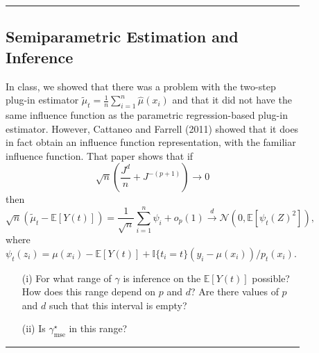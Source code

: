 \documentclass{article}
\newenvironment{colorparagraph}[1]{\par\color{#1}}{\par}
\begin{document}
\begin{figure}[H]
  \begin{colorparagraph}{questioncolor}
  \rule{\textwidth}{0.5pt}
  \label{q1g}
  \subsection{Semiparametric Estimation and Inference}

  In class, we showed that there was a problem with the two-step plug-in estimator \( \tilde{\mu}_t = \frac{1}{n} \sum_{i=1}^n \hat{\mu}(x_i) \) and that it did not have the same influence function as the parametric regression-based plug-in estimator. However, Cattaneo and Farrell (2011) showed that it does in fact obtain an influence function representation, with the familiar influence function. That paper shows that if
  \[
  \sqrt{n} \left( \frac{J^d}{n} + J^{-(p+1)} \right) \to 0
  \]
  then
  \[
  \sqrt{n} (\tilde{\mu}_t - \mathbb{E}[Y(t)]) = \frac{1}{\sqrt{n}} \sum_{i=1}^n \psi_i + o_p(1) \overset{d}{\to} \mathcal{N}(0, \mathbb{E}[\psi_t(Z)^2]),
  \]
  where \( \psi_t(z_i) = \mu(x_i) - \mathbb{E}[Y(t)] + \mathbb{I}\{t_i = t\}(y_i - \mu(x_i)) / p_t(x_i) \).

  \begin{itemize}
      \item[(i)] For what range of \( \gamma \) is inference on the \( \mathbb{E}[Y(t)] \) possible? How does this range depend on \( p \) and \( d \)? Are there values of \( p \) and \( d \) such that this interval is empty?
      \item[(ii)] Is \( \gamma^\star_{\text{mse}} \) in this range?
  \end{itemize}

  \rule{\textwidth}{0.5pt}
  \end{colorparagraph}
\end{figure}
\end{document}
